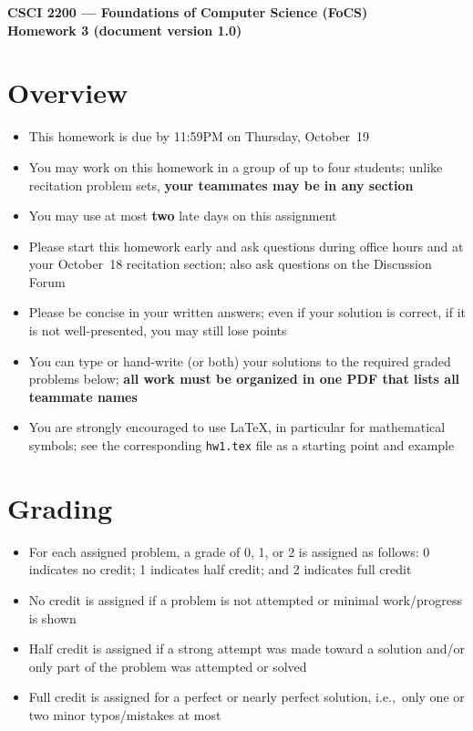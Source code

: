 \documentclass[11pt]{article}
\begin{document}
\thispagestyle{empty}

\begin{center}
\large
\textbf{CSCI 2200 --- Foundations of Computer Science (FoCS) \\
Homework 3 (document version 1.0)}
\end{center}

\section*{Overview}
\begin{itemize}
\item This homework is due by 11:59PM on Thursday, October~19
\item You may work on this homework in a group of up to four students;
  unlike recitation problem sets,
  \textbf{your teammates may be in any section}
\item You may use at most \textbf{two} late days on this assignment
\item Please start this homework early and ask questions during
  office hours and at your October~18 recitation section;
  also ask questions on the Discussion Forum
\item Please be concise in your written answers;
  even if your solution is correct, if it is not well-presented,
  you may still lose points
\item You can type or hand-write (or both) your solutions
  to the required graded problems below;
  \textbf{all work must be organized in one PDF that lists
  all teammate names}
\item You are strongly encouraged to use LaTeX, in particular for
  mathematical symbols;
  see the corresponding \verb+hw1.tex+ file as a starting point
  and example
\end{itemize}


\section*{Grading}
\begin{itemize}
\item For each assigned problem, a grade of 0, 1, or 2 is assigned
  as follows:
  0 indicates no credit;
  1 indicates half credit;
  and 2 indicates full credit
\item No credit is assigned if a problem is not attempted
  or minimal work/progress is shown
\item Half credit is assigned if a strong attempt was made
  toward a solution and/or only part of the problem was attempted or solved
\item Full credit is assigned for a perfect or nearly perfect solution,
  i.e.,~only one or two minor typos/mistakes at most
\end{itemize}
\end{document}
